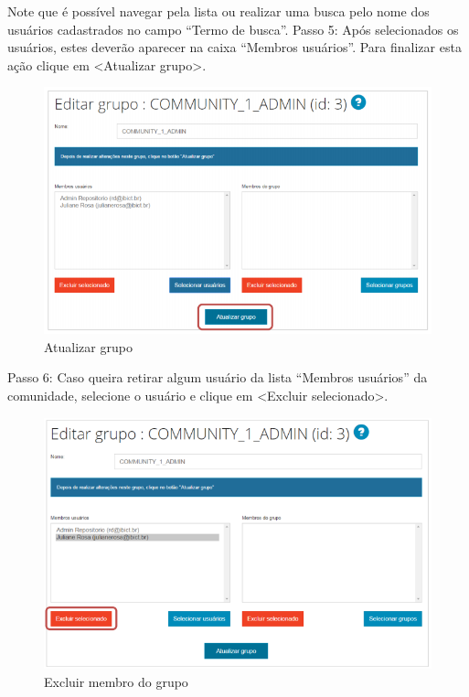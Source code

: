 \documentclass[12pt,hidelinks]{article}
\begin{document}
    \singlespacing
    Note que é possível navegar pela lista ou realizar uma busca pelo nome dos usuários cadastrados no campo “Termo de busca”.
    \singlespacing
    Passo 5: Após selecionados os usuários, estes deverão aparecer na caixa “Membros usuários”. Para finalizar esta ação clique em <Atualizar grupo>.
    \singlespacing
    \begin{figure}[!htp]
                \centering
                \includegraphics[scale=0.7]{figura/Figura22.png}
                \caption{Atualizar grupo}
            \label{Rotulo}
        \end{figure}

\newpage
    
    Passo 6: Caso queira retirar algum usuário da lista “Membros usuários” da comunidade, selecione o usuário e clique em <Excluir selecionado>.
    
    \begin{figure}[!htp]
                \centering
                \includegraphics[scale=0.7]{figura/Figura23.png}
                \caption{Excluir membro do grupo}
            \label{Rotulo}
        \end{figure}
        
\end{document}
